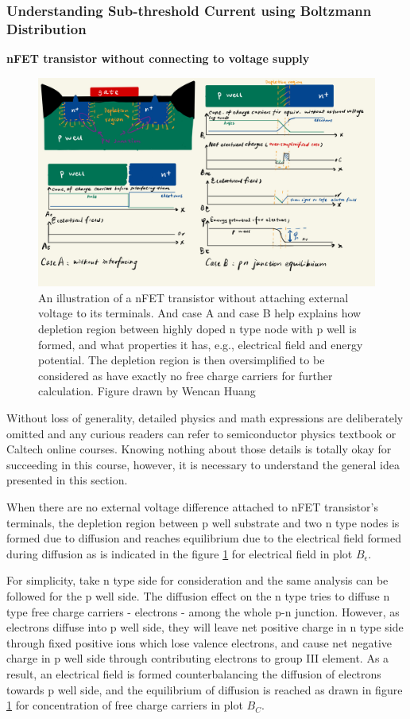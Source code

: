 \subsubsection{Understanding Sub-threshold Current using Boltzmann Distribution}
\textbf{nFET transistor without connecting to voltage supply}
\begin{figure}[H]
    \centering
    \includegraphics[width=0.9\linewidth]{Figures/PNjunc4Transistor_1.jpeg}
    \caption{An illustration of a nFET transistor without attaching external voltage to its terminals. And case A and case B help explains how depletion region between highly doped n type node with p well is formed, and what properties it has, e.g., electrical field and energy potential. The depletion region is then oversimplified to be considered as have exactly no free charge carriers for further calculation. Figure drawn by Wencan Huang}
    \label{fig:342_transistor_1}
\end{figure}

Without loss of generality, detailed physics and math expressions are deliberately omitted and any curious readers can refer to semiconductor physics textbook or Caltech online courses. Knowing nothing about those details is totally okay for succeeding in this course, however, it is necessary to understand the general idea presented in this section. 

When there are no external voltage difference attached to nFET transistor's terminals, the depletion region between p well substrate and two n type nodes is formed due to diffusion and reaches equilibrium due to the electrical field formed during diffusion as is indicated in the figure \ref{fig:342_transistor_1} for electrical field in plot \(B_\epsilon\). 

For simplicity, take n type side for consideration and the same analysis can be followed for the p well side. The diffusion effect on the n type tries to diffuse n type free charge carriers - electrons - among the whole p-n junction. However, as electrons diffuse into p well side, they will leave net positive charge in n type side through fixed positive ions which lose valence electrons, and cause net negative charge in p well side through contributing electrons to group III element. As a result, an electrical field is formed counterbalancing the diffusion of electrons towards p well side, and the equilibrium of diffusion is reached as drawn in figure \ref{fig:342_transistor_1} for concentration of free charge carriers in plot \(B_C\). 

